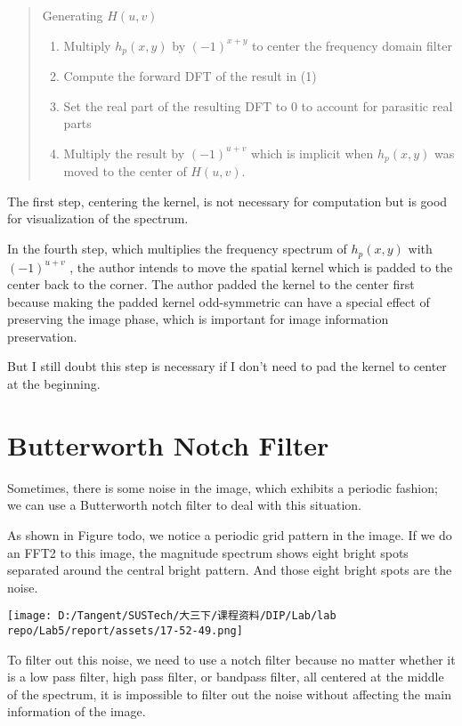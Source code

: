 \documentclass[
]{article}
\begin{document}
\begin{quote}
Generating \(H(u,v)\)

\begin{enumerate}
\def\labelenumi{\arabic{enumi}.}
\item
  Multiply \(h_p(x,y)\) by \((-1)^{x+y} \) to center the frequency
  domain filter
\item
  Compute the forward DFT of the result in (1)
\item
  Set the real part of the resulting DFT to 0 to account for parasitic
  real parts
\item
  Multiply the result by \((-1)^{u+v} \) which is implicit when
  \( h_p(x,y) \) was moved to the center of \( H(u,v) \).
\end{enumerate}
\end{quote}

The first step, centering the kernel, is not necessary for computation
but is good for visualization of the spectrum.

In the fourth step, which multiplies the frequency spectrum of
\(h_p(x, y)\) with \((-1)^{u+v}\) , the author intends to move the
spatial kernel which is padded to the center back to the corner. The
author padded the kernel to the center first because making the padded
kernel odd-symmetric can have a special effect of preserving the image
phase, which is important for image information preservation.

But I still doubt this step is necessary if I don't need to pad the
kernel to center at the beginning.

\hypertarget{butterworth-notch-filter}{%
\section{Butterworth Notch Filter}\label{butterworth-notch-filter}}

Sometimes, there is some noise in the image, which exhibits a periodic
fashion; we can use a Butterworth notch filter to deal with this
situation.

As shown in Figure todo, we notice a periodic grid pattern in the image.
If we do an FFT2 to this image, the magnitude spectrum shows eight
bright spots separated around the central bright pattern. And those
eight bright spots are the noise.

\texttt{[image: D:/Tangent/SUSTech/大三下/课程资料/DIP/Lab/lab repo/Lab5/report/assets/17-52-49.png]}

To filter out this noise, we need to use a notch filter because no
matter whether it is a low pass filter, high pass filter, or bandpass
filter, all centered at the middle of the spectrum, it is impossible to
filter out the noise without affecting the main information of the
image.
\end{document}

